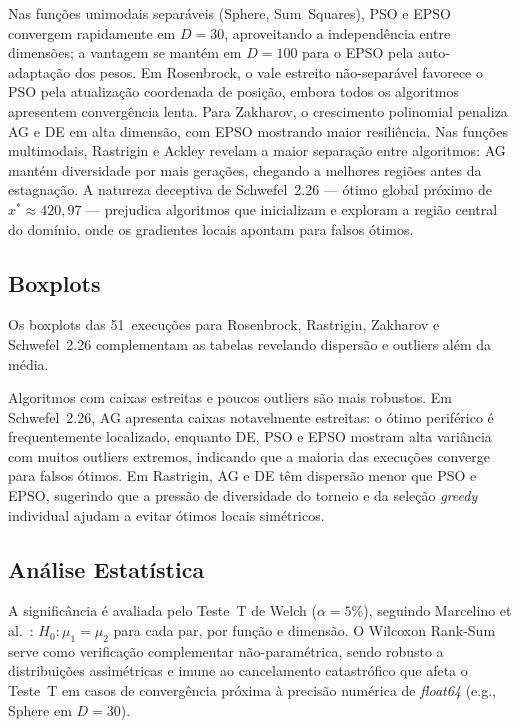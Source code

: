 \documentclass[runningheads]{llncs}
\begin{document}
Nas funções unimodais separáveis (Sphere, Sum~Squares), PSO e EPSO
convergem rapidamente em $D=30$, aproveitando a independência entre
dimensões; a vantagem se mantém em $D=100$ para o EPSO pela
auto-adaptação dos pesos. Em Rosenbrock, o vale estreito não-separável
favorece o PSO pela atualização coordenada de posição, embora todos
os algoritmos apresentem convergência lenta. Para Zakharov, o
crescimento polinomial penaliza AG e DE em alta dimensão, com EPSO
mostrando maior resiliência. Nas funções multimodais, Rastrigin e
Ackley revelam a maior separação entre algoritmos: AG mantém
diversidade por mais gerações, chegando a melhores regiões antes
da estagnação. A natureza deceptiva de Schwefel~2.26 — ótimo global
próximo de $x^*\approx420{,}97$ — prejudica algoritmos que inicializam
e exploram a região central do domínio, onde os gradientes locais
apontam para falsos ótimos.

\subsection{Boxplots}

Os boxplots das 51~execuções para Rosenbrock, Rastrigin, Zakharov e
Schwefel~2.26 complementam as tabelas revelando dispersão e outliers
além da média.


Algoritmos com caixas estreitas e poucos outliers são mais robustos.
Em Schwefel~2.26, AG apresenta caixas notavelmente estreitas: o ótimo
periférico é frequentemente localizado, enquanto DE, PSO e EPSO mostram
alta variância com muitos outliers extremos, indicando que a maioria
das execuções converge para falsos ótimos. Em Rastrigin, AG e DE têm
dispersão menor que PSO e EPSO, sugerindo que a pressão de diversidade
do torneio e da seleção \emph{greedy} individual ajudam a evitar
ótimos locais simétricos.

\subsection{An\'{a}lise Estat\'{i}stica}

A significância é avaliada pelo Teste~T de Welch ($\alpha=5\%$),
seguindo Marcelino et al.~\cite{marcelino2018}: $H_0\!:\mu_1=\mu_2$
para cada par, por função e dimensão. O Wilcoxon Rank-Sum serve
como verificação complementar não-paramétrica, sendo robusto a
distribuições assimétricas e imune ao cancelamento catastrófico
que afeta o Teste~T em casos de convergência próxima à precisão
numérica de \emph{float64} (e.g., Sphere em $D=30$).
\end{document}
